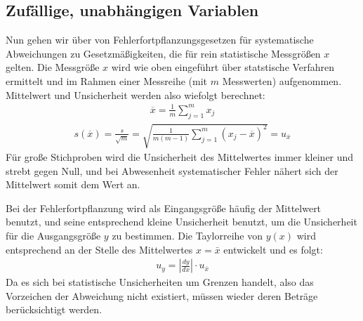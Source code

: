 \documentclass[letterpaper,10pt,english]{jupyterBook}
\begin{document}
\subsection{Zufällige, unabhängigen Variablen }
\label{\detokenize{content/1_Fehlerfortpflanzung:zufallige-unabhangigen-variablen-a-id-subsec-fehlerfortpflanzung-bei-unabhangigen-unsicherheiten-a}}
\sphinxAtStartPar
Nun gehen wir über von Fehlerfortpflanzungsgesetzen für systematische Abweichungen zu Gesetzmäßigkeiten, die für rein statistische Messgrößen \(x\) gelten. Die Messgröße \(x\) wird wie oben eingeführt über statstische Verfahren ermittelt und im Rahmen einer Messreihe (mit \(m\) Messwerten) aufgenommen. Mittelwert und Unsicherheit werden also wiefolgt berechnet:
\begin{equation*}
\begin{split}\overline x = \frac{1}{m}\sum_{j=1}^m x_j\end{split}
\end{equation*}\begin{equation*}
\begin{split}s(\overline x) = \frac{s}{\sqrt{m}} = \sqrt{\frac{1}{m(m-1)} \sum_{j=1}^m (x_j - \overline x)^2} =  u_{\overline x}\end{split}
\end{equation*}
\sphinxAtStartPar
Für große Stichproben wird die Unsicherheit des Mittelwertes immer kleiner und strebt gegen Null, und bei Abwesenheit systematischer Fehler nähert sich der Mittelwert somit dem  Wert an.

\sphinxAtStartPar
Bei der Fehlerfortpflanzung wird als Eingangsgröße häufig der Mittelwert benutzt, und seine entsprechend kleine Unsicherheit benutzt, um die Unsicherheit für die Ausgangsgröße \(y\) zu bestimmen. Die Taylorreihe von \(y(x)\) wird entsprechend an der Stelle des Mittelwertes \(x = \bar x\) entwickelt und es folgt:
\begin{equation*}
\begin{split}u_y = \left| \frac{dy}{dx} \right| \cdot u_\bar x\end{split}
\end{equation*}
\sphinxAtStartPar
Da es sich bei statistische Unsicherheiten um Grenzen handelt, also das Vorzeichen der Abweichung nicht existiert, müssen wieder deren Beträge berücksichtigt werden.
\end{document}
